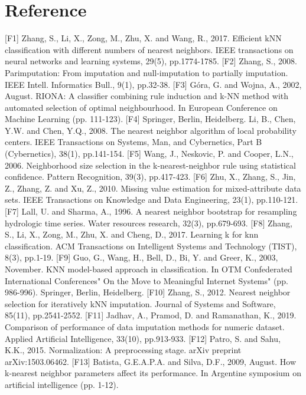 \section{Reference}
[F1] Zhang, S., Li, X., Zong, M., Zhu, X. and Wang, R., 2017. Efficient kNN classification with different numbers of nearest neighbors. IEEE transactions on neural networks and learning systems, 29(5), pp.1774-1785.
[F2] Zhang, S., 2008. Parimputation: From imputation and null-imputation to partially imputation. IEEE Intell. Informatics Bull., 9(1), pp.32-38. 
[F3] Góra, G. and Wojna, A., 2002, August. RIONA: A classifier combining rule induction and k-NN method with automated selection of optimal neighbourhood. In European Conference on Machine Learning (pp. 111-123).
[F4] Springer, Berlin, Heidelberg. Li, B., Chen, Y.W. and Chen, Y.Q., 2008. The nearest neighbor algorithm of local probability centers. IEEE Transactions on Systems, Man, and Cybernetics, Part B (Cybernetics), 38(1), pp.141-154.
[F5] Wang, J., Neskovic, P. and Cooper, L.N., 2006. Neighborhood size selection in the k-nearest-neighbor rule using statistical confidence. Pattern Recognition, 39(3), pp.417-423. 
[F6] Zhu, X., Zhang, S., Jin, Z., Zhang, Z. and Xu, Z., 2010. Missing value estimation for mixed-attribute data sets. IEEE Transactions on Knowledge and Data Engineering, 23(1), pp.110-121.
[F7] Lall, U. and Sharma, A., 1996. A nearest neighbor bootstrap for resampling hydrologic time series. Water resources research, 32(3), pp.679-693.
[F8] Zhang, S., Li, X., Zong, M., Zhu, X. and Cheng, D., 2017. Learning k for knn classification. ACM Transactions on Intelligent Systems and Technology (TIST), 8(3), pp.1-19.
[F9] Guo, G., Wang, H., Bell, D., Bi, Y. and Greer, K., 2003, November. KNN model-based approach in classification. In OTM Confederated International Conferences" On the Move to Meaningful Internet Systems" (pp. 986-996). Springer, Berlin, Heidelberg.
[F10] Zhang, S., 2012. Nearest neighbor selection for iteratively kNN imputation. Journal of Systems and Software, 85(11), pp.2541-2552.
[F11] Jadhav, A., Pramod, D. and Ramanathan, K., 2019. Comparison of performance of data imputation methods for numeric dataset. Applied Artificial Intelligence, 33(10), pp.913-933.
[F12] Patro, S. and Sahu, K.K., 2015. Normalization: A preprocessing stage. arXiv preprint arXiv:1503.06462.
[F13] Batista, G.E.A.P.A. and Silva, D.F., 2009, August. How k-nearest neighbor parameters affect its performance. In Argentine symposium on artificial intelligence (pp. 1-12).
